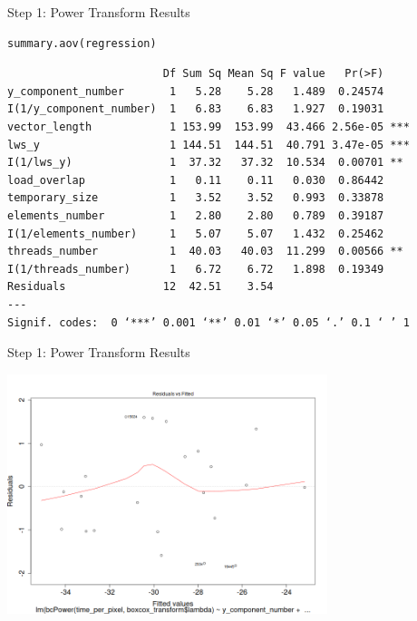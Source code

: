 \documentclass[10pt, compress, aspectratio=169, xcolor={table,usenames,dvipsnames}]{beamer}
\begin{document}
\begin{frame}[fragile,label={sec:org891f97c}]{Step 1: Power Transform Results}
 \scriptsize
\lstset{language=r,label= ,caption= ,captionpos=b,numbers=none}
\begin{lstlisting}
summary.aov(regression)
\end{lstlisting}

\begin{verbatim}
                        Df Sum Sq Mean Sq F value   Pr(>F)
y_component_number       1   5.28    5.28   1.489  0.24574
I(1/y_component_number)  1   6.83    6.83   1.927  0.19031
vector_length            1 153.99  153.99  43.466 2.56e-05 ***
lws_y                    1 144.51  144.51  40.791 3.47e-05 ***
I(1/lws_y)               1  37.32   37.32  10.534  0.00701 **
load_overlap             1   0.11    0.11   0.030  0.86442
temporary_size           1   3.52    3.52   0.993  0.33878
elements_number          1   2.80    2.80   0.789  0.39187
I(1/elements_number)     1   5.07    5.07   1.432  0.25462
threads_number           1  40.03   40.03  11.299  0.00566 **
I(1/threads_number)      1   6.72    6.72   1.898  0.19349
Residuals               12  42.51    3.54
---
Signif. codes:  0 ‘***’ 0.001 ‘**’ 0.01 ‘*’ 0.05 ‘.’ 0.1 ‘ ’ 1
\end{verbatim}

\normalsize
\end{frame}
\begin{frame}[label={sec:orgac4f6fb}]{Step 1: Power Transform Results}
\begin{center}
\includegraphics[width=0.7\textwidth]{../img/regression_after_transform.png}
\end{center}
\end{frame}
\end{document}
